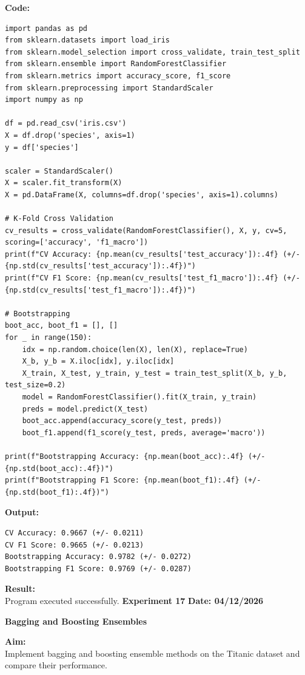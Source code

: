 \documentclass[12pt, a4paper]{article}
\begin{document}
\vspace{\baselineskip}
\noindent \textbf{Code:}\\
\begin{lstlisting}
import pandas as pd
from sklearn.datasets import load_iris
from sklearn.model_selection import cross_validate, train_test_split
from sklearn.ensemble import RandomForestClassifier
from sklearn.metrics import accuracy_score, f1_score
from sklearn.preprocessing import StandardScaler
import numpy as np

df = pd.read_csv('iris.csv')
X = df.drop('species', axis=1)
y = df['species']

scaler = StandardScaler()
X = scaler.fit_transform(X)
X = pd.DataFrame(X, columns=df.drop('species', axis=1).columns)

# K-Fold Cross Validation
cv_results = cross_validate(RandomForestClassifier(), X, y, cv=5, scoring=['accuracy', 'f1_macro'])
print(f"CV Accuracy: {np.mean(cv_results['test_accuracy']):.4f} (+/- {np.std(cv_results['test_accuracy']):.4f})")
print(f"CV F1 Score: {np.mean(cv_results['test_f1_macro']):.4f} (+/- {np.std(cv_results['test_f1_macro']):.4f})")

# Bootstrapping
boot_acc, boot_f1 = [], []
for _ in range(150):
    idx = np.random.choice(len(X), len(X), replace=True)
    X_b, y_b = X.iloc[idx], y.iloc[idx]
    X_train, X_test, y_train, y_test = train_test_split(X_b, y_b, test_size=0.2)
    model = RandomForestClassifier().fit(X_train, y_train)
    preds = model.predict(X_test)
    boot_acc.append(accuracy_score(y_test, preds))
    boot_f1.append(f1_score(y_test, preds, average='macro'))

print(f"Bootstrapping Accuracy: {np.mean(boot_acc):.4f} (+/- {np.std(boot_acc):.4f})")
print(f"Bootstrapping F1 Score: {np.mean(boot_f1):.4f} (+/- {np.std(boot_f1):.4f})")
\end{lstlisting}

\vspace{\baselineskip}

\noindent \textbf{Output:}\\
\begin{lstlisting}[style=terminal]
CV Accuracy: 0.9667 (+/- 0.0211)
CV F1 Score: 0.9665 (+/- 0.0213)
Bootstrapping Accuracy: 0.9782 (+/- 0.0272)
Bootstrapping F1 Score: 0.9769 (+/- 0.0287)
\end{lstlisting}

\vspace{\baselineskip}

\noindent \textbf{Result:}\\
Program executed successfully.
\newpage
\noindent \textbf{Experiment 17} \hfill \textbf{Date: 04/12/2026}\\
\begin{center} \Large \textbf{Bagging and Boosting Ensembles} \end{center}
\textbf{Aim:}\\
Implement bagging and boosting ensemble methods on the Titanic dataset and compare their performance.
\end{document}
